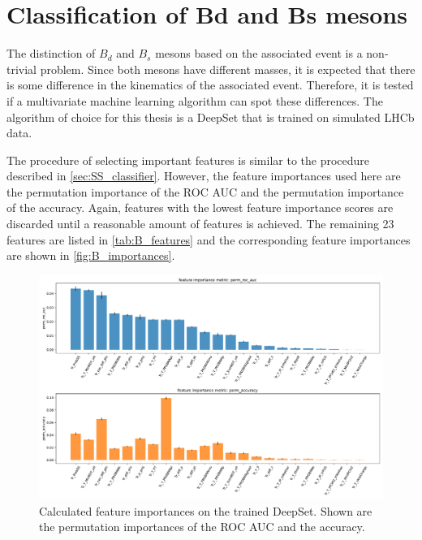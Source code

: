 \section{Classification of Bd and Bs mesons}

The distinction of $B_d$ and $B_s$ mesons based on the associated event is a non-trivial problem.
Since both mesons have different masses, it is expected that there is some difference in the kinematics of the associated event.
Therefore, it is tested if a multivariate machine learning algorithm can spot these differences.
The algorithm of choice for this thesis is a DeepSet that is trained on simulated LHCb data.

The procedure of selecting important features is similar to the procedure described in \autoref{sec:SS_classifier}.
However, the feature importances used here are the permutation importance of the ROC AUC and the permutation importance of the accuracy.
Again, features with the lowest feature importance scores are discarded until a reasonable amount of features is achieved.
The remaining 23 features are listed in \autoref{tab:B_features} and the corresponding feature importances are shown in \autoref{fig:B_importances}.

\begin{figure}
    \centering
    \includegraphics[width=\textwidth]{images/B_feature_importances.pdf}
    \caption{Calculated feature importances on the trained DeepSet. Shown are the permutation importances of the ROC AUC and the accuracy.}
    \label{fig:B_importances}
\end{figure}

